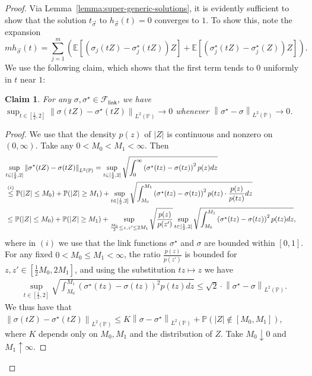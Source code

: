 \documentclass[10pt,a4paper]{amsart}
\theoremstyle{plain}
\newtheorem{claim}{Claim}
\newcommand{\E}{\mathbb{E}}
\newcommand{\Prb}{\mathbb{P}}
\renewcommand{\P}{\mathbb{P}}
\newcommand{\prn}[1]{\left({#1}\right)}
\newcommand{\norm}[1]{\left\|{#1}\right\|}
\newcommand{\Flink}{\mathcal{F}_{\mathsf{link}}}
\newcommand{\LtwoP}[1]{\norm{#1}_{L^2(\Prb)}}
\newcommand{\half}{\frac{1}{2}}
\newcommand{\opt}{^\star}
\begin{document}
\begin{proof}
	Via Lemma~\ref{lemma:super-generic-solutions}, it is evidently
	sufficient to show that the solution $t_{\vec{\sigma}}$ to
	$h_{\vec{\sigma}}(t) = 0$ converges to $1$.
	To show this,
	note the expansion
	\begin{equation}
		\label{eqn:expand-h-m}
		m h_{\vec{\sigma}}(t) =
		\sum_{j = 1}^m \left(\E[(\sigma_j(tZ) - \sigma_j\opt(tZ)) Z]
		+ \E[(\sigma_j\opt(tZ) - \sigma_j\opt(Z))Z]
		\right).
	\end{equation}
	We use the following claim, which shows that
	the first term tends to 0 uniformly in $t$ near $1$:
	\begin{claim}
		\label{claim:taco}
		For any $\sigma, \sigma\opt \in \Flink$, we have
		$\sup_{t \in [\half,2]} \LtwoP{\sigma(tZ) - \sigma\opt(tZ)}
		\to 0$ whenever $\LtwoP{\sigma\opt - \sigma} \to 0$.
	\end{claim}
	\begin{proof}
		We use that the density $p(z)$ of $|Z|$ is continuous
		and nonzero on $(0, \infty)$. Take any $0 < M_0 < M_1 < \infty$.
		Then
		\begin{align*}
			\lefteqn{\sup_{t \in [\half, 2]}
				\LtwoP{\sigma\opt(tZ) - \sigma(tZ)}
				=  \sup_{t \in [\half, 2]} \sqrt{\int_0^\infty \prn{\sigma\opt(tz) - \sigma(tz)}^2 p(z) dz}} \\
			& \stackrel{(i)}{\leq}
			\Prb(|Z| \leq M_0) + \Prb(|Z| \geq M_1) +
			\sup_{t \in [\half, 2]} \sqrt{\int_{M_0}^{M_1}
				\prn{\sigma\opt(tz) - \sigma(tz)}^2 p(tz) \cdot
				\frac{p(z)}{p(tz)} dz} \nonumber \\
			& \leq \Prb(|Z| \leq M_0) + \Prb(|Z| \geq M_1) + \sup_{
				\frac{M_0}{2} \le z, z'
				\le 2 M_1}
			\sqrt{\frac{p(z)}{p(z')}}
			\sup_{t \in [\half, 2]} \sqrt{\int_{M_0}^{M_1}
				\prn{\sigma\opt(tz) - \sigma(tz)}^2 p(tz) dz}  ,
		\end{align*}
		where in $(i)$ we use that the link functions $\sigma\opt$ and $\sigma$
		are bounded within $[0,1]$. For any fixed $0 < M_0 \le M_1 < \infty$,
		the ratio $\frac{p(z)}{p(z')}$ is bounded
		for $z, z' \in [\half M_0, 2 M_1]$, and using
		the substitution $tz \mapsto z$ we have
		\begin{align*}
			\sup_{t \in [\half, 2]} \sqrt{
				\int_{M_0}^{M_1}
				\prn{\sigma\opt(tz) - \sigma(tz)}^2 p(tz) dz}
			\leq \sqrt{2} \cdot \LtwoP{\sigma\opt - \sigma}.
		\end{align*}
		We thus have that
		$\LtwoP{\sigma(tZ) - \sigma\opt(tZ)}
		\le K \LtwoP{\sigma - \sigma\opt}
		+ \P(|Z| \not \in [M_0, M_1])$,
		where $K$ depends only on $M_0, M_1$ and the
		distribution of $Z$.
		Take $M_0 \downarrow 0$ and $M_1 \uparrow \infty$.
	\end{proof}
	

\end{proof}
\end{document}
